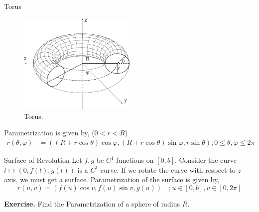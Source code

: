 \documentclass[../Analysis-3.tex]{subfiles}
\begin{document}
\begin{Eg}{Torus}{}
  \begin{figure}[H]
    \centering
    \includegraphics[width=0.5\textwidth]{../figures/lec-24.3.png}
    \caption{Torus.}
  \end{figure}

  Parametrization is given by, ($0<r<R$)
  \begin{align} \label{eq:5}
    r(\theta, \varphi) & = ((R+r\cos \theta)\cos \varphi,(R+r\cos \theta)\sin \varphi, r \sin \theta) ; 0\le \theta, \varphi \le 2\pi
  \end{align}
\end{Eg}

\begin{Eg}{Surface of Revolution}{}
  Let $f,g$ be $C^1$ functions on $[0,b]$. Consider the curve $t \longmapsto (0,f(t),g(t))$ is a $C^1$ curve. If we rotate the curve with respect to $z$ axis, we must get a surface. Parametrization  of the surface is given by,
  \[r(u,v) = (f(u)\cos v,f(u)\sin v,g(u)) \quad; u \in [0,b], v \in [0,2\pi] \]
\end{Eg}

\textbf{Exercise.} Find the Parametrization of a sphere of radius $R$.
\end{document}

